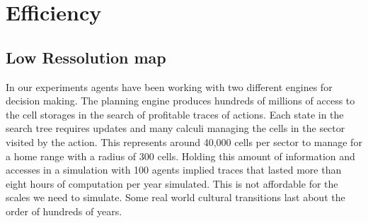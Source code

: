 \documentclass[11pt,oneside,a4paper,openright]{report}
\begin{document}
	






\section{Efficiency}

\subsection{Low Ressolution map}

In our experiments agents have been working with two different engines for decision making. The planning engine produces hundreds of millions of access to the cell storages in the search of profitable traces of actions. Each state in the search tree requires updates and many calculi managing the cells in the sector visited by the action. 
This represents around 40,000 cells per sector to manage for a home range with a radius of 300 cells. Holding this amount of information and accesses in a simulation with 100 agents implied traces that lasted more than eight hours of computation per year simulated. This is not affordable for the scales we need to simulate. Some real world cultural transitions last about the order of hundreds of years. 
\end{document}
